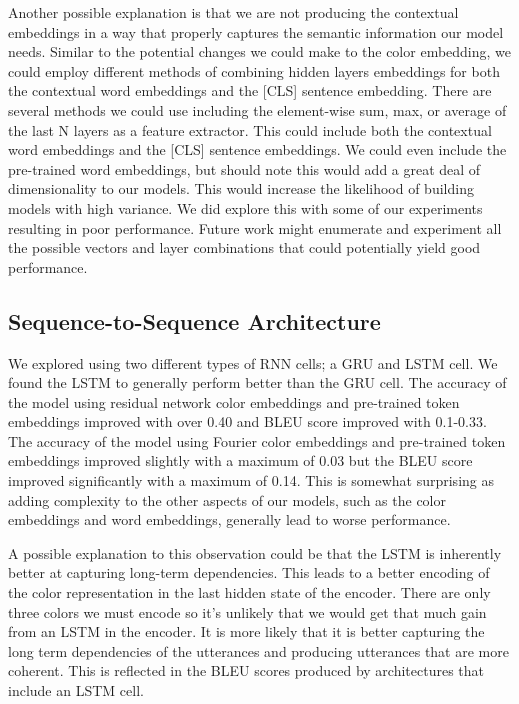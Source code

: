 \par
Another possible explanation is that we are not producing the contextual embeddings in a way that properly captures the semantic information our model needs. Similar to the potential changes we could make to the color embedding, we could employ different methods of combining hidden layers embeddings for both the contextual word embeddings and the [CLS] sentence embedding. There are several methods we could use including the element-wise sum, max, or average of the last N layers as a feature extractor. This could include both the contextual word embeddings and the [CLS] sentence embeddings. We could even include the pre-trained word embeddings, but should note this would add a great deal of dimensionality to our models. This would increase the likelihood of building models with high variance.  We did explore this with some of our experiments resulting in poor performance. Future work might enumerate and experiment all the possible vectors and layer combinations that could potentially yield good performance.


\subsection{Sequence-to-Sequence Architecture}

We explored using two different types of RNN cells; a GRU and LSTM cell.  We found the LSTM to generally perform better than the GRU cell. The accuracy of the model using residual network color embeddings and pre-trained token embeddings improved with over 0.40 and BLEU score improved with 0.1-0.33. The accuracy of the model using Fourier color embeddings and pre-trained token embeddings improved slightly with a maximum of 0.03 but the BLEU score improved significantly with a maximum of 0.14. This is somewhat surprising as adding complexity to the other aspects of our models, such as the color embeddings and word embeddings, generally lead to worse performance.

\par
A possible explanation to this observation could be that the LSTM is inherently better at capturing long-term dependencies. This leads to a better encoding of the color representation in the last hidden state of the encoder. There are only three colors we must encode so it’s unlikely that we would get that much gain from an LSTM in the encoder. It is more likely that it is better capturing the long term dependencies of the utterances and producing utterances that are more coherent. This is reflected in the BLEU scores produced by architectures that include an LSTM cell.

